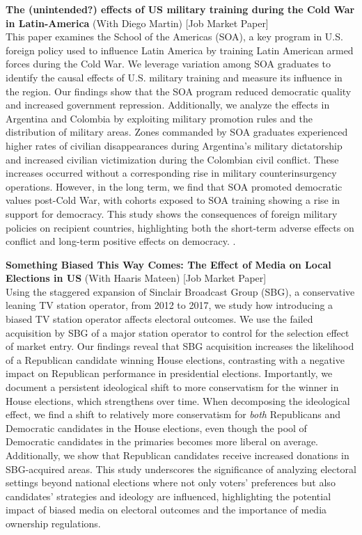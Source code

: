 \documentclass{moderncv}
\begin{document}
{\textbf{The (unintended?) effects of US military training during the Cold War in Latin-America} (With Diego Martin) [Job Market Paper] \\ }
{This paper examines the School of the Americas (SOA), a key program in U.S. foreign policy used to influence Latin America by training Latin American armed forces during the Cold War. We leverage variation among SOA graduates to identify the causal effects of U.S. military training and measure its influence in the region. Our findings show that the SOA program reduced democratic quality and increased government repression. Additionally, we analyze the effects in Argentina and Colombia by exploiting military promotion rules and the distribution of military areas. Zones commanded by SOA graduates experienced higher rates of civilian disappearances during Argentina's military dictatorship and increased civilian victimization during the Colombian civil conflict. These increases occurred without a corresponding rise in military counterinsurgency operations. However, in the long term, we find that SOA promoted democratic values post-Cold War, with cohorts exposed to SOA training showing a rise in support for democracy. This study shows the consequences of foreign military policies on recipient countries, highlighting both the short-term adverse effects on conflict and long-term positive effects on democracy. .}
\vspace*{0.35cm}


{\textbf{Something Biased This Way Comes: The Effect of Media on Local Elections in US} (With Haaris Mateen) [Job Market Paper] \\ }
{Using the staggered expansion of Sinclair Broadcast Group (SBG), a conservative leaning TV station operator, from 2012 to 2017, we study how introducing a biased TV station operator affects electoral outcomes. We use the failed acquisition by SBG of a major station operator to control for the selection effect of market entry. Our findings reveal that SBG acquisition increases the likelihood of a Republican candidate winning House elections, contrasting with a negative impact on Republican performance in presidential elections. Importantly, we document a persistent ideological shift to more conservatism for the winner in House elections, which strengthens over time. When decomposing the ideological effect, we find a shift to relatively more conservatism for \textit{both} Republicans and Democratic candidates in the House elections, even though the pool of Democratic candidates in the primaries becomes more liberal on average. Additionally, we show that Republican candidates receive increased donations in SBG-acquired areas. This study underscores the significance of analyzing electoral settings  beyond national elections where not only voters' preferences but also candidates' strategies and ideology are influenced, highlighting the potential impact of biased media on electoral outcomes and the importance of media ownership regulations.  \\} \vspace*{0.25cm}
\end{document}
